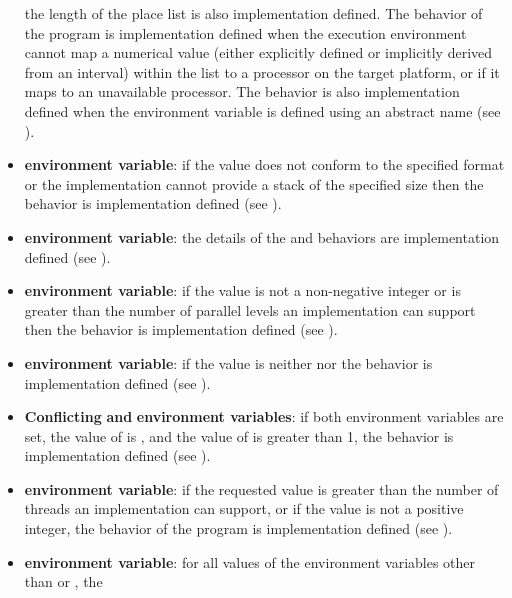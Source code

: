 \begin{itemize}
      the length of the place list is also implementation defined. The behavior 
      of the program is implementation defined when the execution environment 
      cannot map a numerical value (either explicitly defined or implicitly 
      derived from an interval) within the  list to a processor 
      on the target platform, or if it maps to an unavailable processor. The 
      behavior is also implementation defined when the  
      environment variable is defined using an abstract name 
      (see ).
\item {} \textbf{environment variable}: if the value does 
      not conform to the specified format or the implementation cannot provide 
      a stack of the specified size then the behavior is implementation defined 
      (see ).
\item {} \textbf{environment variable}: the details of the 
       and  behaviors are implementation defined 
      (see ).
\item {} \textbf{environment variable}: if the value 
      is not a non-negative integer or is greater than the number of parallel 
      levels an implementation can support then the behavior is implementation 
      defined (see ).
\item {} \textbf{environment variable}: if the value is neither
       nor  the behavior is implementation defined (see
      ).
\item \textbf{Conflicting }  \textbf{and} 
       \textbf{environment variables}: if both 
      environment variables are set, the value of  is
      , and the value of  is greater
      than 1, the behavior is implementation defined (see ).
\item {} \textbf{environment variable}: if the requested 
      value is greater than the number of threads an implementation can support, 
      or if the value is not a positive integer, the behavior of the program is 
      implementation defined (see ).
\item {} \textbf{environment variable}: for all values 
      of the environment variables other than  or , the 

\end{itemize}
